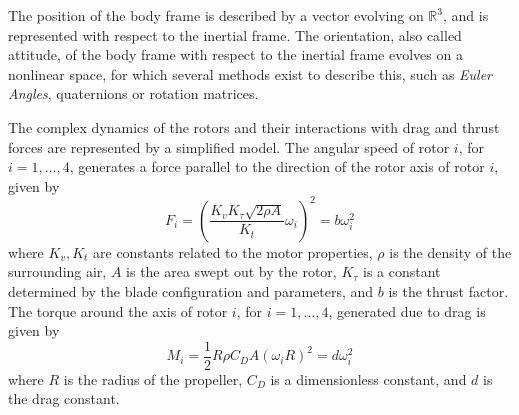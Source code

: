 The position of the body frame is described by a vector evolving on $ \mathbb{R}^3 $, and is represented with respect to the inertial frame. The orientation, also called attitude, of the body frame with respect to the inertial frame evolves on a nonlinear space, for which several methods exist to describe this, such as \textit{Euler Angles}, quaternions or rotation matrices. 

The complex dynamics of the rotors and their interactions with drag and thrust forces are represented by a simplified model. 
The angular speed  of rotor $ i $, for $ i=1,\dots,4 $, generates a force  parallel to the direction of the rotor axis of rotor $ i $, given by
\begin{equation}\label{key}
F_i=\left( \frac{K_vK_\tau\sqrt{2\rho A}}{K_t}\omega_i\right)^2=b\omega_i^2 
\end{equation}
where $ K_v,K_t $ are constants related to the motor properties, $ \rho $ is the density of the surrounding air, $ A $ is the area swept out by the rotor, $ K_\tau $ is a constant determined by the blade configuration and parameters, and $ b $ is the thrust factor.\\
The torque around the axis of rotor $ i $, for $ i=1,\dots,4 $, generated due to drag is given by
\begin{equation}\label{key}
M_{i}=\frac{1}{2}R\rho C_DA(\omega_iR)^2=d\omega_i^2
\end{equation}
where $ R $ is the radius of the propeller, $ C_D $ is a dimensionless constant, and $ d $ is the drag constant.

